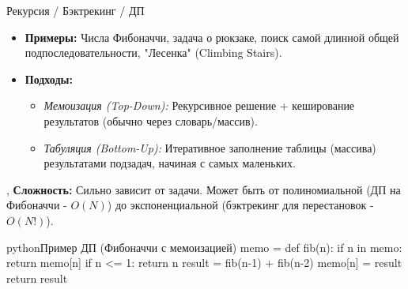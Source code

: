 \begin{alerttextbox}{Рекурсия / Бэктрекинг / ДП}
\begin{itemize}[nosep, leftmargin=*]
        \item \textbf{Примеры:} Числа Фибоначчи, задача о рюкзаке, поиск самой длинной общей подпоследовательности, "Лесенка" (Climbing Stairs).
        \item \textbf{Подходы:}
            \begin{itemize}
                \item \textit{Мемоизация (Top-Down):} Рекурсивное решение + кеширование результатов (обычно через словарь/массив).
                \item \textit{Табуляция (Bottom-Up):} Итеративное заполнение таблицы (массива) результатами подзадач, начиная с самых маленьких.
            \end{itemize}
    \end{itemize} \sep
    \textbf{Сложность:} Сильно зависит от задачи. Может быть от полиномиальной (ДП на Фибоначчи - $O(N)$) до экспоненциальной (бэктрекинг для перестановок - $O(N!)$).
    \begin{codebox}{python}{Пример ДП (Фибоначчи с мемоизацией)}
    memo = {}
    def fib(n):
        if n in memo: return memo[n]
        if n <= 1: return n
        result = fib(n-1) + fib(n-2)
        memo[n] = result
        return result
    \end{codebox}
\end{alerttextbox}


